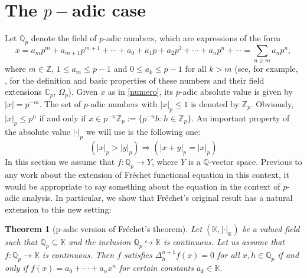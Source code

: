 \documentclass[12pt,a4paper]{amsart}
\newtheorem{theorem}{Theorem}[section]
\theoremstyle{definition}
\begin{document}
\section{The $p-$adic case} Let $\mathbb{Q}_p$ denote the field of $p$-adic numbers, which are expressions of the form
\begin{equation}\label{numero}
x=a_{m}p^{m}+a_{m+1}p^{m+1}+\cdots+a_0+a_1p+a_2p^2+ \cdots + a_np^n +\cdots =\sum_{n\geq m}a_np^n,
\end{equation}
where $m\in\mathbb{Z}$, $1\leq a_{m}\leq p-1$ and  $0\leq a_k\leq p-1$ for all $k>m$ (see, for example, \cite{gouvea}, \cite{robert} for the definition and basic properties of these numbers and their field extensions $\mathbb{C}_p$, $\Omega_p$).    Given $x$ as in \eqref{numero},  its $p$-adic absolute value is given by $|x|=p^{-m}$. The set of $p$-adic numbers with $|x|_p\leq 1$ is denoted by $\mathbb{Z}_p$. Obviously, $|x|_p\leq p^n$ if and only if $x\in p^{-n}\mathbb{Z}_p:=\{p^{-n}h: h\in\mathbb{Z}_p\}$. An important property of the absolute value $|\cdot|_p$ we will use is the following one:
\begin{equation}\label{propiedadnumeros}
 (|x|_p>|y|_p) \Rightarrow (|x+y|_p=|x|_p)
 \end{equation}
In this section we assume that $f:\mathbb{Q}_p\to Y$, where $Y$ is a $\mathbb{Q}$-vector space. Previous to any work about the extension of Fr\'{e}chet functional equation in this context, it would be appropriate to say something about the equation in the context of $p$-adic analysis.  In particular, we show that Fr\'{e}chet's original result has a natural extension to this new setting:

\begin{theorem}[p-adic version of Fr\'{e}chet's theorem]   \label{teo1}
Let $(\mathbb{K},|\cdot|_{\mathbb{K}})$ be a valued field such that $\mathbb{Q}_p\subseteq \mathbb{K}$ and the inclusion $\mathbb{Q}_p \hookrightarrow\mathbb{K}$ is continuous. Let us assume that $f:\mathbb{Q}_p\to \mathbb{K}$ is continuous. Then $f$ satisfies $\Delta_h^{n+1}f(x)=0$ for all $x,h\in\mathbb{Q}_p$ if and only if  $f(x)=a_0+\cdots+a_nx^n$ for certain constants $a_k\in \mathbb{K}$.
\end{theorem}
\end{document}
